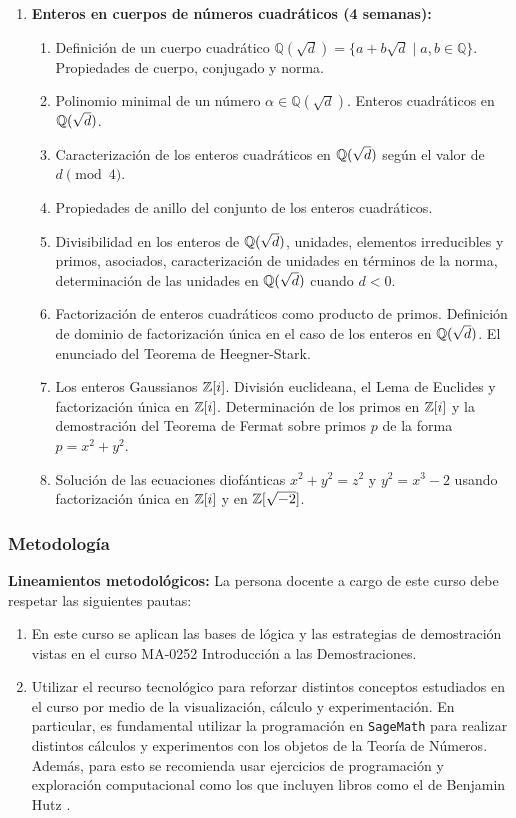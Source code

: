 \begin{refsection}
\begin{enumerate}
\item \textbf{Enteros en cuerpos de números cuadráticos (4 semanas):} 
\begin{enumerate}
    \item Definición de un cuerpo cuadrático $\mathbb{Q}(\sqrt{d}) = \{ a + b\sqrt{d} \mid a, b \in \mathbb{Q} \}$. Propiedades de cuerpo, conjugado y norma.
    \item Polinomio minimal de un número $\alpha \in \mathbb{Q}(\sqrt{d})$. Enteros cuadráticos en $\mathbb{Q}(\sqrt{d})$.
    \item Caracterización de los enteros cuadráticos en $\mathbb{Q}(\sqrt{d})$ según el valor de $d \pmod{4}$. 
    \item Propiedades de anillo del conjunto de los enteros cuadráticos.
    \item Divisibilidad en los enteros de $\mathbb{Q}(\sqrt{d})$, unidades, elementos irreducibles y primos, asociados, caracterización de unidades en términos de la norma, determinación de las unidades en $\mathbb{Q}(\sqrt{d})$ cuando $d < 0$.
    \item Factorización de enteros cuadráticos como producto de primos. Definición de dominio de factorización única en el caso de los enteros en $\mathbb{Q}(\sqrt{d})$. El enunciado del Teorema de Heegner-Stark.
    \item Los enteros Gaussianos $\mathbb{Z}[i]$. División euclideana, el Lema de Euclides y factorización única en $\mathbb{Z}[i]$. Determinación de los primos en $\mathbb{Z}[i]$ y la demostración del Teorema de Fermat sobre primos $p$ de la forma $p = x^2 + y^2$.
    \item Solución de las ecuaciones diofánticas $x^2 + y^2 = z^2$ y $y^2 = x^3 - 2$ usando factorización única en $\mathbb{Z}[i]$ y en $\mathbb{Z}[\sqrt{-2}]$.
\end{enumerate}

\end{enumerate}

\subsubsection*{Metodología}

\noindent \textbf{Lineamientos metodológicos:} La persona docente a cargo de este curso debe respetar las siguientes pautas:
\begin{enumerate}
    \item En este curso se aplican las bases de lógica y las estrategias de demostración vistas en el curso MA-0252 Introducción a las Demostraciones.
   \item Utilizar el recurso tecnológico para reforzar distintos conceptos estudiados en el curso por medio de la visualización, cálculo y experimentación. En particular, es fundamental utilizar la programación en \texttt{SageMath} para realizar distintos cálculos y experimentos con los objetos de la Teoría de Números. Además, para esto se recomienda usar ejercicios de programación y exploración computacional como los que incluyen libros como el de Benjamin Hutz \cite{Hut18}.
\end{enumerate}


\end{refsection}
